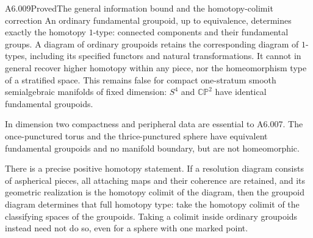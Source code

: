 \begin{saresult}{A6.009}{Proved}{The general information bound and the homotopy-colimit correction}
An ordinary fundamental groupoid, up to equivalence, determines
exactly the homotopy $1$-type: connected components and their
fundamental groups. A diagram of ordinary groupoids retains
the corresponding diagram of $1$-types, including its specified
functors and natural transformations. It cannot in general
recover higher homotopy within any piece, nor the homeomorphism
type of a stratified space. This remains false for compact
one-stratum smooth semialgebraic manifolds of fixed dimension:
$S^4$ and $\mathbb{CP}^2$ have identical fundamental groupoids.

In dimension two compactness and peripheral data are essential
to A6.007. The once-punctured torus and the thrice-punctured sphere
have equivalent fundamental groupoids and no manifold boundary,
but are not homeomorphic.

There is a precise positive homotopy statement. If a resolution
diagram consists of aspherical pieces, all attaching maps and
their coherence are retained, and its geometric realization is
the homotopy colimit of the diagram, then the groupoid diagram
determines that full homotopy type: take the homotopy colimit
of the classifying spaces of the groupoids. Taking a colimit
inside ordinary groupoids instead need not do so, even for a
sphere with one marked point.
\end{saresult}
